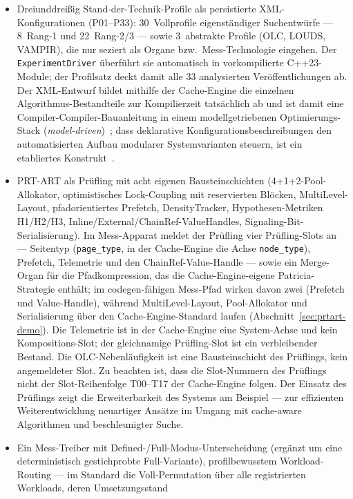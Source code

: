 \begin{itemize}
  zwei durch Prüfling-Slots ersetzt.
  \item Dreiunddreißig Stand-der-Technik-Profile als persistierte XML-Konfigurationen (P01--P33):
  30~Vollprofile eigenständiger Suchentwürfe --- 8~Rang-1 und 22~Rang-2/3 --- sowie 3~abstrakte Profile
  (OLC, LOUDS, VAMPIR), die nur seziert als Organe bzw.\ Mess-Technologie eingehen. Der
  \texttt{ExperimentDriver} überführt sie automatisch in vorkompilierte C++23-Module; der Profilsatz
  deckt damit alle 33 analysierten Veröffentlichungen ab. Der XML-Entwurf bildet mithilfe der
  Cache-Engine die einzelnen Algorithmus-Bestandteile zur Kompilierzeit tatsächlich ab und ist damit eine
  Compiler-Compiler-Bauanleitung in einem modellgetriebenen Optimierungs-Stack
  (\emph{model-driven})~\cite{schmidt2006modeldriven}; dass deklarative Konfigurationsbeschreibungen den
  automatisierten Aufbau modularer Systemvarianten steuern, ist ein etabliertes
  Konstrukt~\cite{czarnecki2000generative, apel2013feature}.
  \item PRT-ART als Prüfling mit acht eigenen Bausteinschichten (4+1+2-Pool-Allokator, optimistisches
  Lock-Coupling mit reservierten Blöcken, MultiLevel-Layout, pfadorientiertes Prefetch,
  DensityTracker, Hypothesen-Metriken H1/H2/H3, Inline/External/ChainRef-ValueHandles,
  Signaling-Bit-Serialisierung). Im Mess-Apparat meldet der Prüfling vier Prüfling-Slots an --- Seitentyp
  (\texttt{page\_type}, in der Cache-Engine die Achse \texttt{node\_type}), Prefetch, Telemetrie und den
  ChainRef-Value-Handle --- sowie ein Merge-Organ für die Pfadkompression, das die Cache-Engine-eigene
  Patricia-Strategie enthält; im codegen-fähigen Mess-Pfad wirken davon zwei (Prefetch und
  Value-Handle), während MultiLevel-Layout, Pool-Allokator und Serialisierung über den
  Cache-Engine-Standard laufen (Abschnitt~\ref{sec:prtart-demo}). Die Telemetrie ist in der Cache-Engine
  eine System-Achse und kein Kompositions-Slot; der gleichnamige Prüfling-Slot ist ein
  verbleibender Bestand. Die OLC-Nebenläufigkeit ist eine Bausteinschicht des Prüflings, kein angemeldeter Slot.
  Zu beachten ist, dass die Slot-Nummern des Prüflings nicht der Slot-Reihenfolge T00--T17 der
  Cache-Engine folgen. Der Einsatz des Prüflings zeigt die Erweiterbarkeit des Systems am Beispiel ---
  zur effizienten Weiterentwicklung neuartiger Ansätze im Umgang mit cache-aware Algorithmen und
  beschleunigter Suche.
  \item Ein Mess-Treiber mit Defined-/Full-Modus-Unterscheidung (ergänzt um eine deterministisch
  gestichprobte Full-Variante), profilbewusstem Workload-Routing --- im Standard die Voll-Permutation über alle registrierten Workloads, deren Umsetzungsstand

\end{itemize}
